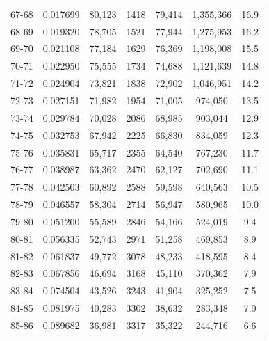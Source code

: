 \documentclass[10pt,a4paper]{article}
\begin{document}
\begin{longtable}{|c|c|c|c|c|c|c|}
67-68  & 0.017699      & 80,123       & 1418          & 79,414        & 1,355,366    & 16.9         \\
68-69  & 0.019320      & 78,705       & 1521          & 77,944        & 1,275,953    & 16.2         \\
69-70  & 0.021108      & 77,184       & 1629          & 76,369        & 1,198,008    & 15.5         \\
70-71  & 0.022950      & 75,555       & 1734          & 74,688        & 1,121,639    & 14.8         \\
71-72  & 0.024904      & 73,821       & 1838          & 72,902        & 1,046,951    & 14.2         \\
72-73  & 0.027151      & 71,982       & 1954          & 71,005        & 974,050      & 13.5         \\
73-74  & 0.029784      & 70,028       & 2086          & 68,985        & 903,044      & 12.9         \\
74-75  & 0.032753      & 67,942       & 2225          & 66,830        & 834,059      & 12.3         \\
75-76  & 0.035831      & 65,717       & 2355          & 64,540        & 767,230      & 11.7         \\
76-77  & 0.038987      & 63,362       & 2470          & 62,127        & 702,690      & 11.1         \\
77-78  & 0.042503      & 60,892       & 2588          & 59,598        & 640,563      & 10.5         \\
78-79  & 0.046557      & 58,304       & 2714          & 56,947        & 580,965      & 10.0         \\
79-80  & 0.051200      & 55,589       & 2846          & 54,166        & 524,019      & 9.4          \\
80-81  & 0.056335      & 52,743       & 2971          & 51,258        & 469,853      & 8.9          \\
81-82  & 0.061837      & 49,772       & 3078          & 48,233        & 418,595      & 8.4          \\
82-83  & 0.067856      & 46,694       & 3168          & 45,110        & 370,362      & 7.9          \\
83-84  & 0.074504      & 43,526       & 3243          & 41,904        & 325,252      & 7.5          \\
84-85  & 0.081975      & 40,283       & 3302          & 38,632        & 283,348      & 7.0          \\
85-86  & 0.089682      & 36,981       & 3317          & 35,322        & 244,716      & 6.6          \\

\end{longtable}
\end{document}
